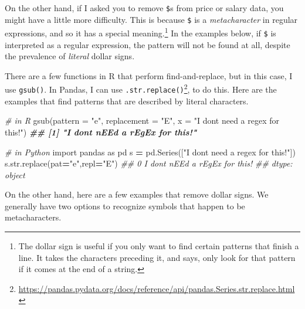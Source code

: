 \documentclass[
  12pt,
  krantz2]{krantz}
\makeatletter
\newenvironment{Shaded}{\begin{snugshade}}{\end{snugshade}}
\newcommand{\AttributeTok}[1]{\textcolor[rgb]{0.61,0.61,0.61}{#1}}
\newcommand{\BuiltInTok}[1]{#1}
\newcommand{\CommentTok}[1]{\textcolor[rgb]{0.37,0.37,0.37}{\textit{#1}}}
\newcommand{\DocumentationTok}[1]{\textcolor[rgb]{0.37,0.37,0.37}{\textbf{\textit{#1}}}}
\newcommand{\FunctionTok}[1]{\textcolor[rgb]{0,0,0}{#1}}
\newcommand{\ImportTok}[1]{#1}
\newcommand{\NormalTok}[1]{#1}
\newcommand{\OperatorTok}[1]{\textcolor[rgb]{0.43,0.43,0.43}{\textbf{#1}}}
\newcommand{\StringTok}[1]{\textcolor[rgb]{0.5,0.5,0.5}{#1}}
\renewcommand{\href}[2]{#2\footnote{\url{#1}}}
\newenvironment{kframe}{%
\medskip{}
\setlength{\fboxsep}{.8em}
 \def\at@end@of@kframe{}%
 \ifinner\ifhmode%
  \def\at@end@of@kframe{\end{minipage}}%
  \begin{minipage}{\columnwidth}%
 \fi\fi%
 \def\FrameCommand##1{\hskip\@totalleftmargin \hskip-\fboxsep
 \colorbox{shadecolor}{##1}\hskip-\fboxsep
     \hskip-\linewidth \hskip-\@totalleftmargin \hskip\columnwidth}%
 \MakeFramed {\advance\hsize-\width
   \@totalleftmargin\z@ \linewidth\hsize
   \@setminipage}}%
 {\par\unskip\endMakeFramed%
 \at@end@of@kframe}
\renewenvironment{Shaded}{\begin{kframe}}{\end{kframe}}
\makeatother
\begin{document}
On the other hand, if I asked you to remove \texttt{\$}s from price or salary data, you might have a little more difficulty. This is because \texttt{\$} is a \emph{metacharacter} in regular expressions, and so it has a special meaning.\footnote{The dollar sign is useful if you only want to find certain patterns that finish a line. It takes the characters preceding it, and says, only look for that pattern if it comes at the end of a string.} In the examples below, if \texttt{\$} is interpreted as a regular expression, the pattern will not be found at all, despite the prevalence of \emph{literal} dollar signs.

There are a few functions in R that perform find-and-replace, but in this case, I use \texttt{gsub()}. In Pandas, I can use \href{https://pandas.pydata.org/docs/reference/api/pandas.Series.str.replace.html}{\texttt{.str.replace()}}, to do this. Here are the examples that find patterns that are described by literal characters.

\begin{Shaded}
\begin{Highlighting}[]
\CommentTok{\# in R}
\FunctionTok{gsub}\NormalTok{(}\AttributeTok{pattern =} \StringTok{"e"}\NormalTok{, }\AttributeTok{replacement =} \StringTok{"E"}\NormalTok{, }
     \AttributeTok{x =} \StringTok{"I don\textquotesingle{}t need a regex for this!"}\NormalTok{)}
\DocumentationTok{\#\# [1] "I don\textquotesingle{}t nEEd a rEgEx for this!"}
\end{Highlighting}
\end{Shaded}

\begin{Shaded}
\begin{Highlighting}[]
\CommentTok{\# in Python}
\ImportTok{import}\NormalTok{ pandas }\ImportTok{as}\NormalTok{ pd}
\NormalTok{s }\OperatorTok{=}\NormalTok{ pd.Series([}\StringTok{"I don\textquotesingle{}t need a regex for this!"}\NormalTok{])}
\NormalTok{s.}\BuiltInTok{str}\NormalTok{.replace(pat}\OperatorTok{=}\StringTok{"e"}\NormalTok{,repl}\OperatorTok{=}\StringTok{"E"}\NormalTok{)}
\CommentTok{\#\# 0    I don\textquotesingle{}t nEEd a rEgEx for this!}
\CommentTok{\#\# dtype: object}
\end{Highlighting}
\end{Shaded}

On the other hand, here are a few examples that remove dollar signs. We generally have two options to recognize symbols that happen to be metacharacters.
\end{document}
